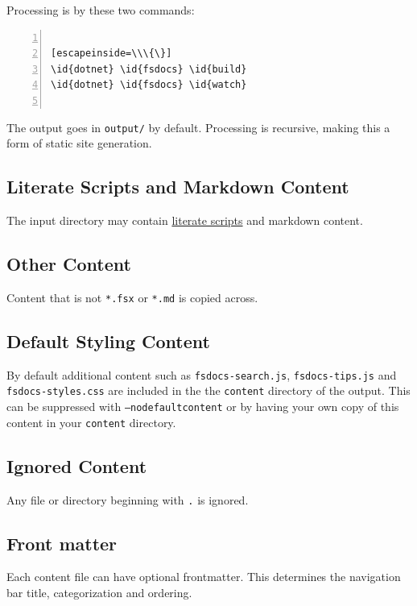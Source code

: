 \documentclass{article}
\newcommand{\id}[1]{\textcolor{black}{#1}}
\begin{document}
Processing is by these two commands:
\begin{lstlisting}[numbers=left]

[escapeinside=\\\{\}]
\id{dotnet} \id{fsdocs} \id{build}
\id{dotnet} \id{fsdocs} \id{watch}


\end{lstlisting}



The output goes in \texttt{output/} by default.  Processing is recursive, making this a form of static site generation.
\subsection*{Literate Scripts and Markdown Content}



The input directory may contain \href{literate.html}{literate scripts} and markdown content.
\subsection*{Other Content}



Content that is not \texttt{*.fsx} or \texttt{*.md} is copied across.
\subsection*{Default Styling Content}



By default additional content such as \texttt{fsdocs-search.js}, \texttt{fsdocs-tips.js} and \texttt{fsdocs-styles.css} are included in the
the \texttt{content} directory of the output.  This can be suppressed with \texttt{--nodefaultcontent} or by having your own
copy of this content in your \texttt{content} directory.
\subsection*{Ignored Content}



Any file or directory beginning with \texttt{.} is ignored.
\subsection*{Front matter}



Each content file can have optional frontmatter.  This determines the navigation bar title, categorization and ordering.
\end{document}
